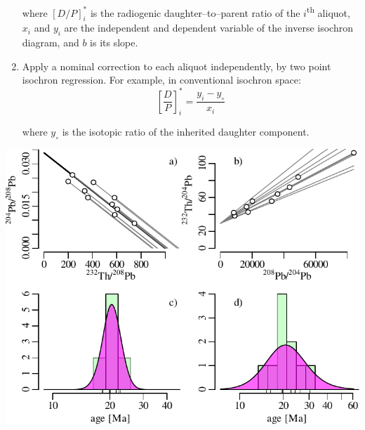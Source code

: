 \begin{refsection}
\begin{enumerate}
    \noindent where $[D/P]_i^\ast$ is the radiogenic
    daughter--to--parent ratio of the $i$\textsuperscript{th} aliquot,
    $x_i$ and $y_i$ are the independent and dependent variable of the
    inverse isochron diagram, and $b$ is its slope.

  \item Apply a nominal correction to each aliquot independently, by
    two point isochron regression. For example, in conventional
    isochron space:
    \begin{equation}
      \left[\frac{D}{P}\right]_i^\ast = \frac{y_i - y_\circ}{x_i}
      \label{eq:DP*conventional}
    \end{equation}

    \noindent where $y_\circ$ is the isotopic ratio of the inherited
    daughter component.
\end{enumerate}

\noindent\begin{minipage}[t][][b]{.65\linewidth}
\includegraphics[width=\textwidth]{../figures/ThPbSingleGrain.pdf}
\end{minipage}
\begin{minipage}[t][][t]{.35\linewidth}
  \label{fig:ThPbSingleGrain}
\end{minipage}

\printbibliography[heading=subbibliography]

\end{refsection}
